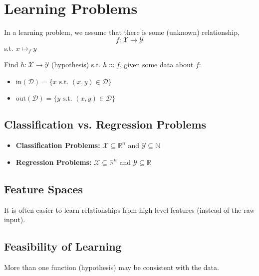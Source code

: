 \section{Learning Problems}
\begin{definition}
    In a learning problem, we assume that there is some (unknown) relationship, 
    \begin{equation*}
        f: \mathcal{X} \rightarrow \mathcal{Y}
    \end{equation*}
    s.t. $x \mapsto_f y$
    \vspace{1em}

    Find $h: \mathcal{X} \rightarrow \mathcal{Y}$ (hypothesis) s.t. $h \approx f$, given some data about $f$: 

    \begin{itemize}
        \item $\text{in}(\mathcal{D}) = \{x \text{ s.t. } (x,y) \in \mathcal{D}\}$
        \item $\text{out}(\mathcal{D}) = \{y \text{ s.t. } (x,y) \in \mathcal{D}\}$
    \end{itemize}
\end{definition}

\subsection{Classification vs. Regression Problems}
\begin{definition}
    \begin{itemize}
        \item \textbf{Classification Problems:} $\mathcal{X} \subseteq \mathbb{R}^n$ and $\mathcal{Y} \subseteq \mathbb{N}$
        \item \textbf{Regression Problems:} $\mathcal{X} \subseteq \mathbb{R}^n$ and $\mathcal{Y} \subseteq \mathbb{R}$
    \end{itemize}
\end{definition}

\subsection{Feature Spaces}
\begin{definition}
    It is often easier to learn relationships from high-level features (instead of the raw input).
\end{definition}

\subsection{Feasibility of Learning}
\begin{motivation}
    More than one function (hypothesis) may be consistent with the data.
\end{motivation}

